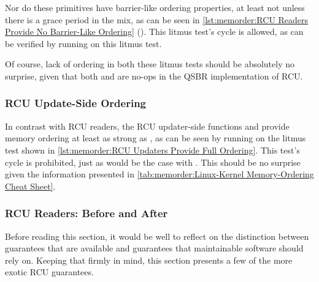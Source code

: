 Nor do these primitives have barrier-like ordering properties,
at least not unless there is a grace period in the mix, as can be seen in
\cref{lst:memorder:RCU Readers Provide No Barrier-Like Ordering}
().
This litmus test's cycle is allowed, as can be verified by running
 on this litmus test.

\begin{listing}[tb]

\caption{RCU Readers Provide No Barrier-Like Ordering}
\label{lst:memorder:RCU Readers Provide No Barrier-Like Ordering}
\end{listing}

Of course, lack of ordering in both these litmus tests should be absolutely
no surprise, given that both  and 
are no-ops in the QSBR implementation of RCU.

\subsubsection{RCU Update-Side Ordering}
\label{sec:memorder:RCU Update-Side Ordering}

In contrast with RCU readers, the RCU updater-side functions
 and 
provide memory ordering at least as strong as ,
as can be seen by running  on the litmus test shown in
\cref{lst:memorder:RCU Updaters Provide Full Ordering}.
This test's cycle is prohibited, just as would be the case with
.
This should be no surprise given the information presented in
\cref{tab:memorder:Linux-Kernel Memory-Ordering Cheat Sheet}.

\begin{listing}[tb]

\caption{RCU Updaters Provide Full Ordering}
\label{lst:memorder:RCU Updaters Provide Full Ordering}
\end{listing}

\subsubsection{RCU Readers: Before and After}
\label{sec:memorder:RCU Readers: Before and After}

Before reading this section, it would be well to reflect on the distinction
between guarantees that are available and guarantees that maintainable
software should rely on.
Keeping that firmly in mind, this section presents a few of the
more exotic RCU guarantees.

